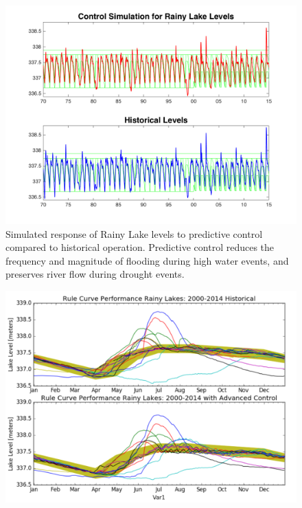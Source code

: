 \documentclass[preprint,times]{elsarticle}
\begin{document}
\begin{figure}
\includegraphics[width=\linewidth]{RLSim_Results}
\caption{Simulated response of Rainy Lake levels to predictive control compared to historical operation. Predictive control reduces the frequency and magnitude of flooding during high water events, and preserves river flow during drought events.}\label{figure:RLSimResults}
\end{figure}

\begin{figure}
\includegraphics[width=\linewidth]{RLSimResultsA}
\caption{}\label{figure:RLSimResultsA}
\end{figure}
\end{document}
